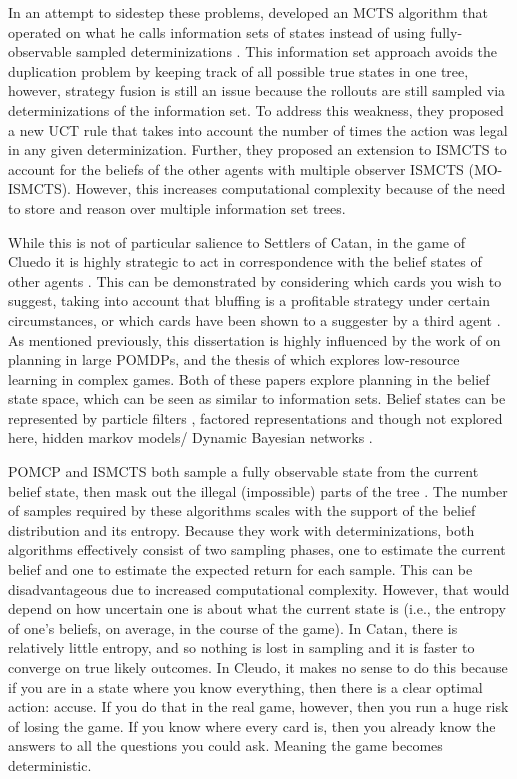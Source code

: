 \documentclass[msc, ai, twoside, notimes, logo, parskip, leftchapter, normalheadings]{infthesis}
\begin{document}
In an attempt to sidestep these problems, \citep{Cowling} developed an MCTS algorithm that operated on what he calls information sets of states instead of using fully-observable sampled determinizations \citep{Cowling}. This information set approach avoids the duplication problem by keeping track of all possible true states in one tree, however, strategy fusion is still an issue because the rollouts are still sampled via determinizations of the information set. To address this weakness, they proposed a new UCT rule that takes into account the number of times the action was legal in any given determinization. Further, they proposed an extension to ISMCTS to account for the beliefs of the other agents with multiple observer ISMCTS (MO-ISMCTS). However, this increases computational complexity because of the need to store and reason over multiple information set trees. 

While this is not of particular salience to Settlers of Catan, in the game of Cluedo it is highly strategic to act in correspondence with the belief states of other agents \citep{Mihai}. This can be demonstrated by considering which cards you wish to suggest, taking into account that bluffing is a profitable strategy under certain circumstances, or which cards have been shown to a suggester by a third agent \citep{IPP}. As mentioned previously, this dissertation is highly influenced by the work of \citep{Silver-veness} on planning in large POMDPs, and the thesis of \citep{Mihai} which explores low-resource learning in complex games. Both of these papers explore planning in the belief state space, which can be seen as similar to information sets. Belief states can be represented by particle filters \citep{Silver-veness}, factored representations \citep{Mihai} and though not explored here, hidden markov models/ Dynamic Bayesian networks \citep{Russell-norvig}. 

POMCP and ISMCTS both sample a fully observable state from the current belief state, then mask out the illegal (impossible) parts of the tree \citep{Mihai}. The number of samples required by these algorithms scales with the support of the belief distribution and its entropy. Because they work with determinizations, both algorithms effectively consist of two sampling phases, one to estimate the current belief and one to estimate the expected return for each sample. This can be disadvantageous due to increased computational complexity. However, that would depend on how uncertain one is about what the current state is (i.e., the entropy of one's beliefs, on average, in the course of the game). In Catan, there is relatively little entropy, and so nothing is lost in sampling and it is faster to converge on true likely outcomes. In Cleudo, it makes no sense to do this because if you are in a state where you know everything, then there is a clear optimal action: accuse. If you do that in the real game, however, then you run a huge risk of losing the game. If you know where every card is, then you already know the answers to all the questions you could ask. Meaning the game becomes deterministic. 
\end{document}
